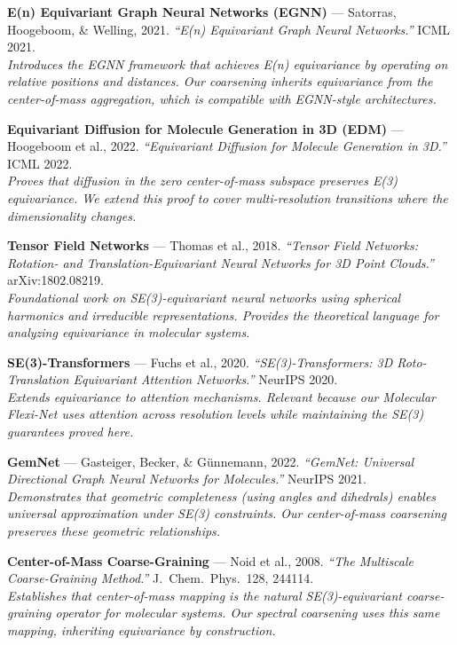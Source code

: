 \documentclass[12pt,a4paper]{article}
\begin{document}
\begin{enumerate}[leftmargin=*, label={[\arabic*]}]

\item \textbf{E(n) Equivariant Graph Neural Networks (EGNN)} --- Satorras, Hoogeboom, \& Welling, 2021.
\textit{``E(n) Equivariant Graph Neural Networks.''}
ICML 2021.\\
\emph{Introduces the EGNN framework that achieves E(n) equivariance by operating on relative positions and distances. Our coarsening inherits equivariance from the center-of-mass aggregation, which is compatible with EGNN-style architectures.}

\item \textbf{Equivariant Diffusion for Molecule Generation in 3D (EDM)} --- Hoogeboom et al., 2022.
\textit{``Equivariant Diffusion for Molecule Generation in 3D.''}
ICML 2022.\\
\emph{Proves that diffusion in the zero center-of-mass subspace preserves E(3) equivariance. We extend this proof to cover multi-resolution transitions where the dimensionality changes.}

\item \textbf{Tensor Field Networks} --- Thomas et al., 2018.
\textit{``Tensor Field Networks: Rotation- and Translation-Equivariant Neural Networks for 3D Point Clouds.''}
arXiv:1802.08219.\\
\emph{Foundational work on SE(3)-equivariant neural networks using spherical harmonics and irreducible representations. Provides the theoretical language for analyzing equivariance in molecular systems.}

\item \textbf{SE(3)-Transformers} --- Fuchs et al., 2020.
\textit{``SE(3)-Transformers: 3D Roto-Translation Equivariant Attention Networks.''}
NeurIPS 2020.\\
\emph{Extends equivariance to attention mechanisms. Relevant because our Molecular Flexi-Net uses attention across resolution levels while maintaining the SE(3) guarantees proved here.}

\item \textbf{GemNet} --- Gasteiger, Becker, \& G\"{u}nnemann, 2022.
\textit{``GemNet: Universal Directional Graph Neural Networks for Molecules.''}
NeurIPS 2021.\\
\emph{Demonstrates that geometric completeness (using angles and dihedrals) enables universal approximation under SE(3) constraints. Our center-of-mass coarsening preserves these geometric relationships.}

\item \textbf{Center-of-Mass Coarse-Graining} --- Noid et al., 2008.
\textit{``The Multiscale Coarse-Graining Method.''}
J.\ Chem.\ Phys.\ 128, 244114.\\
\emph{Establishes that center-of-mass mapping is the natural SE(3)-equivariant coarse-graining operator for molecular systems. Our spectral coarsening uses this same mapping, inheriting equivariance by construction.}

\end{enumerate}
\end{document}
